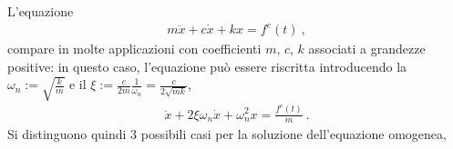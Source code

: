 \documentclass[letterpaper,10pt,italian]{jupyterBook}
\begin{document}
\sphinxAtStartPar
L’equazione
\begin{equation*}
\begin{split}m\ddot{x} + c \dot{x} + k x = f^e(t) \ ,\end{split}
\end{equation*}
\sphinxAtStartPar
compare in molte applicazioni con coefficienti \(m\), \(c\), \(k\) associati a grandezze positive: in questo caso, l’equazione può essere riscritta introducendo la  \(\omega_n := \sqrt{\frac{k}{m}}\) e il  \(\xi:= \frac{c}{2 m}\frac{1}{\omega_n} = \frac{c}{2 \sqrt{m k}}\),
\begin{equation*}
\begin{split}\ddot{x} + 2 \xi \omega_n \dot{x} + \omega_n^2 x = \frac{f^e(t)}{m} \ .\end{split}
\end{equation*}
\sphinxAtStartPar
{} Si distinguono quindi 3 possibili casi per la soluzione dell’equazione omogenea,
\end{document}
